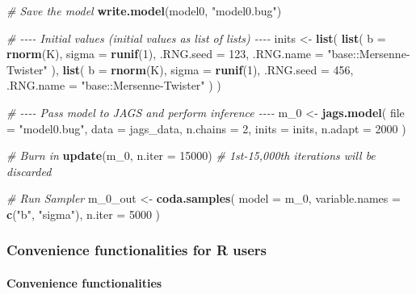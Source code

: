 \documentclass[
  11pt,
]{article}
\newenvironment{Shaded}{\begin{snugshade}}{\end{snugshade}}
\newcommand{\AttributeTok}[1]{\textcolor[rgb]{0.13,0.29,0.53}{#1}}
\newcommand{\CommentTok}[1]{\textcolor[rgb]{0.56,0.35,0.01}{\textit{#1}}}
\newcommand{\DecValTok}[1]{\textcolor[rgb]{0.00,0.00,0.81}{#1}}
\newcommand{\FunctionTok}[1]{\textcolor[rgb]{0.13,0.29,0.53}{\textbf{#1}}}
\newcommand{\NormalTok}[1]{#1}
\newcommand{\OtherTok}[1]{\textcolor[rgb]{0.56,0.35,0.01}{#1}}
\newcommand{\StringTok}[1]{\textcolor[rgb]{0.31,0.60,0.02}{#1}}
\begin{document}
\begin{Shaded}
\begin{Highlighting}[]
\CommentTok{\# Save the model}
\FunctionTok{write.model}\NormalTok{(model0, }\StringTok{"model0.bug"}\NormalTok{)}

\CommentTok{\# {-}{-}{-}{-} Initial values (initial values as list of lists) {-}{-}{-}{-}}
\NormalTok{inits }\OtherTok{\textless{}{-}} \FunctionTok{list}\NormalTok{(}
  \FunctionTok{list}\NormalTok{(}
    \AttributeTok{b =} \FunctionTok{rnorm}\NormalTok{(K),}
    \AttributeTok{sigma =} \FunctionTok{runif}\NormalTok{(}\DecValTok{1}\NormalTok{),}
    \AttributeTok{.RNG.seed =} \DecValTok{123}\NormalTok{,}
    \AttributeTok{.RNG.name =} \StringTok{"base::Mersenne{-}Twister"}
\NormalTok{  ),}
  \FunctionTok{list}\NormalTok{(}
    \AttributeTok{b =} \FunctionTok{rnorm}\NormalTok{(K),}
    \AttributeTok{sigma =} \FunctionTok{runif}\NormalTok{(}\DecValTok{1}\NormalTok{),}
    \AttributeTok{.RNG.seed =} \DecValTok{456}\NormalTok{,}
    \AttributeTok{.RNG.name =} \StringTok{"base::Mersenne{-}Twister"}
\NormalTok{  )}
\NormalTok{)}

\CommentTok{\# {-}{-}{-}{-} Pass model to JAGS and perform inference {-}{-}{-}{-}}
\NormalTok{m\_0 }\OtherTok{\textless{}{-}} \FunctionTok{jags.model}\NormalTok{(}
  \AttributeTok{file =} \StringTok{"model0.bug"}\NormalTok{,}
  \AttributeTok{data =}\NormalTok{ jags\_data,}
  \AttributeTok{n.chains =} \DecValTok{2}\NormalTok{,}
  \AttributeTok{inits =}\NormalTok{ inits,}
  \AttributeTok{n.adapt =} \DecValTok{2000}
\NormalTok{)}

\CommentTok{\# Burn in}
\FunctionTok{update}\NormalTok{(m\_0, }\AttributeTok{n.iter =} \DecValTok{15000}\NormalTok{) }\CommentTok{\# 1st{-}15,000th iterations will be discarded}

\CommentTok{\# Run Sampler}
\NormalTok{m\_0\_out }\OtherTok{\textless{}{-}} \FunctionTok{coda.samples}\NormalTok{(}
  \AttributeTok{model =}\NormalTok{ m\_0,}
  \AttributeTok{variable.names =} \FunctionTok{c}\NormalTok{(}\StringTok{"b"}\NormalTok{, }\StringTok{"sigma"}\NormalTok{),}
  \AttributeTok{n.iter =} \DecValTok{5000}
\NormalTok{)}
\end{Highlighting}
\end{Shaded}

\hypertarget{convenience-functionalities-for-r-users}{%
\subsubsection{Convenience functionalities for R users}\label{convenience-functionalities-for-r-users}}

\hypertarget{convenience-functionalities}{%
\paragraph{Convenience functionalities}\label{convenience-functionalities}}
\end{document}
